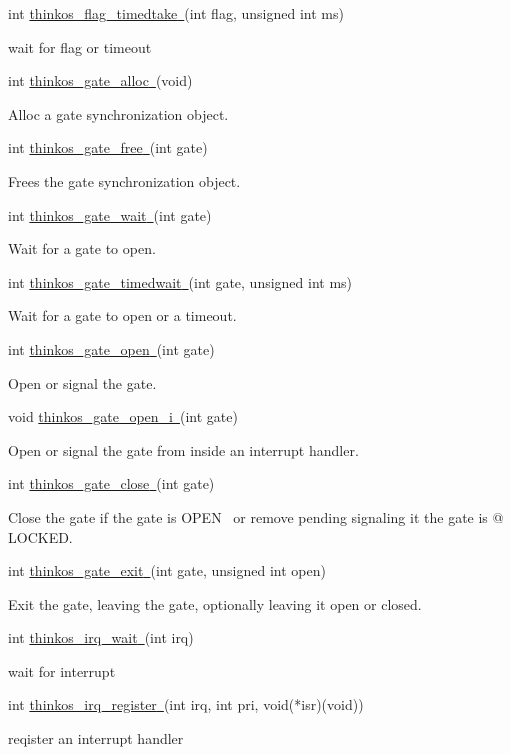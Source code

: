 {{int
}{\protect\hyperlink{h.4k668n3}{thinkos\_flag\_timedtake}}{\protect\hyperlink{h.4k668n3}{~}}{(int
flag, unsigned int ms)}

{wait for flag or timeout }

{int
}{\protect\hyperlink{h.1egqt2p}{thinkos\_gate\_alloc}}{\protect\hyperlink{h.1egqt2p}{~}}{(void)}

{Alloc a gate synchronization object. }

{int
}{\protect\hyperlink{h.3ygebqi}{thinkos\_gate\_free}}{\protect\hyperlink{h.3ygebqi}{~}}{(int
gate)}

{Frees the gate synchronization object. }

{int
}{\protect\hyperlink{h.2dlolyb}{thinkos\_gate\_wait}}{\protect\hyperlink{h.2dlolyb}{~}}{(int
gate)}

{Wait for a gate to open. }

{int
}{\protect\hyperlink{h.sqyw64}{thinkos\_gate\_timedwait}}{\protect\hyperlink{h.sqyw64}{~}}{(int
gate, unsigned int ms)}

{Wait for a gate to open or a timeout. }

{int
}{\protect\hyperlink{h.3cqmetx}{thinkos\_gate\_open}}{\protect\hyperlink{h.3cqmetx}{~}}{(int
gate)}

{Open or signal the gate. }

{void
}{\protect\hyperlink{h.1rvwp1q}{thinkos\_gate\_open\_i}}{\protect\hyperlink{h.1rvwp1q}{~}}{(int
gate)}

{Open or signal the gate from inside an interrupt handler. }

{int
}{\protect\hyperlink{h.4bvk7pj}{thinkos\_gate\_close}}{\protect\hyperlink{h.4bvk7pj}{~}}{(int
gate)}

{Close the gate if the gate is }{OPEN}{~ or remove pending signaling it
the gate is @ LOCKED. }

{int
}{\protect\hyperlink{h.2r0uhxc}{thinkos\_gate\_exit}}{\protect\hyperlink{h.2r0uhxc}{~}}{(int
gate, unsigned int open)}

{Exit the gate, leaving the gate, optionally leaving it open or closed.
}

{int
}{\protect\hyperlink{h.3q5sasy}{thinkos\_irq\_wait}}{\protect\hyperlink{h.3q5sasy}{~}}{(int
irq)}

{wait for interrupt }

{int
}{\protect\hyperlink{h.25b2l0r}{thinkos\_irq\_register}}{\protect\hyperlink{h.25b2l0r}{~}}{(int
irq, int pri, void(*isr)(void))}

{reqister an interrupt handler }

}
